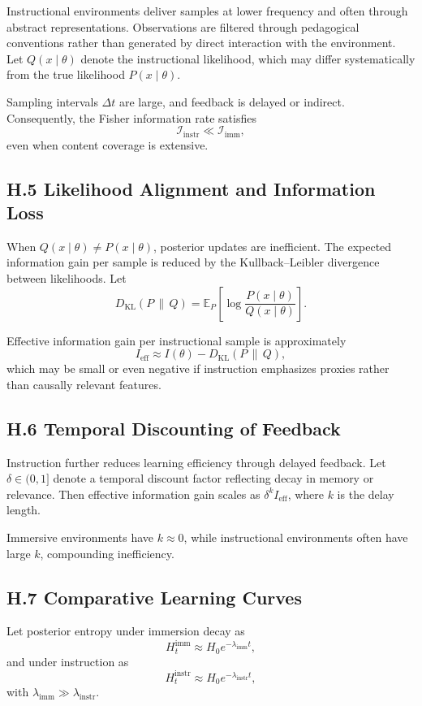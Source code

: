 \documentclass[11pt]{article}
\begin{document}
Instructional environments deliver samples at lower frequency and often through abstract representations. Observations are filtered through pedagogical conventions rather than generated by direct interaction with the environment. Let \(Q(x \mid \theta)\) denote the instructional likelihood, which may differ systematically from the true likelihood \(P(x \mid \theta)\).

Sampling intervals \(\Delta t\) are large, and feedback is delayed or indirect. Consequently, the Fisher information rate satisfies
\[
\mathcal{I}_{\text{instr}} \ll \mathcal{I}_{\text{imm}},
\]
even when content coverage is extensive.

\subsection{H.5 Likelihood Alignment and Information Loss}

When \(Q(x \mid \theta) \neq P(x \mid \theta)\), posterior updates are inefficient. The expected information gain per sample is reduced by the Kullback–Leibler divergence between likelihoods. Let
\[
D_{\mathrm{KL}}(P \,\|\, Q) = \mathbb{E}_{P}\!\left[\log \frac{P(x \mid \theta)}{Q(x \mid \theta)}\right].
\]

Effective information gain per instructional sample is approximately
\[
I_{\text{eff}} \approx I(\theta) - D_{\mathrm{KL}}(P \,\|\, Q),
\]
which may be small or even negative if instruction emphasizes proxies rather than causally relevant features.

\subsection{H.6 Temporal Discounting of Feedback}

Instruction further reduces learning efficiency through delayed feedback. Let \(\delta \in (0,1]\) denote a temporal discount factor reflecting decay in memory or relevance. Then effective information gain scales as \(\delta^k I_{\text{eff}}\), where \(k\) is the delay length.

Immersive environments have \(k \approx 0\), while instructional environments often have large \(k\), compounding inefficiency.

\subsection{H.7 Comparative Learning Curves}

Let posterior entropy under immersion decay as
\[
H_t^{\text{imm}} \approx H_0 e^{-\lambda_{\text{imm}} t},
\]
and under instruction as
\[
H_t^{\text{instr}} \approx H_0 e^{-\lambda_{\text{instr}} t},
\]
with \(\lambda_{\text{imm}} \gg \lambda_{\text{instr}}\).
\end{document}

